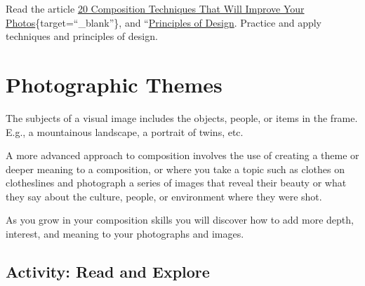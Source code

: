 \documentclass[
]{book}
\begin{document}
\begin{reflect}
Read the article \href{https://petapixel.com/2016/09/14/20-composition-techniques-will-improve-photos/}{20 Composition Techniques That Will Improve Your Photos}\{target=``\_blank''\}, and ``\href{https://www.getty.edu/education/teachers/building_lessons/principles_design.pdf}{Principles of Design}. Practice and apply techniques and principles of design.
\end{reflect}

\hypertarget{photographic-themes}{%
\section{Photographic Themes}\label{photographic-themes}}

The subjects of a visual image includes the objects, people, or items in the frame. E.g., a mountainous landscape, a portrait of twins, etc.

A more advanced approach to composition involves the use of creating a theme or deeper meaning to a composition, or where you take a topic such as clothes on clotheslines and photograph a series of images that reveal their beauty or what they say about the culture, people, or environment where they were shot.

As you grow in your composition skills you will discover how to add more depth, interest, and meaning to your photographs and images.

\hypertarget{activity-read-and-explore}{%
\subsection*{Activity: Read and Explore}\label{activity-read-and-explore}}
\end{document}
